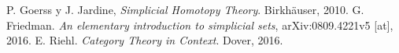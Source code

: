 \documentclass[11pt]{report}
\theoremstyle{colored}
\begin{document}
\begin{thebibliography}{}
 P. Goerss y J. Jardine, \textit{Simplicial Homotopy Theory}. Birkhäuser, 2010.
 G. Friedman. \textit{An elementary introduction to simplicial sets}, arXiv:0809.4221v5 [at], 2016.
 E. Riehl. \textit{Category Theory in Context}. Dover, 2016.
\end{thebibliography}
\end{document}
